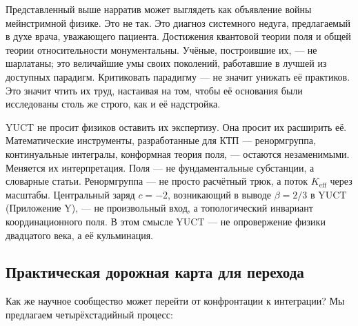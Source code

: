 \documentclass[12pt,a4paper]{article}
\begin{document}
	Представленный выше нарратив может выглядеть как объявление войны мейнстримной физике. Это не так. Это диагноз системного недуга, предлагаемый в духе врача, уважающего пациента. Достижения квантовой теории поля и общей теории относительности монументальны. Учёные, построившие их, — не шарлатаны; это величайшие умы своих поколений, работавшие в лучшей из доступных парадигм. Критиковать парадигму — не значит унижать её практиков. Это значит чтить их труд, настаивая на том, чтобы её основания были исследованы столь же строго, как и её надстройка.
	
	YUCT не просит физиков оставить их экспертизу. Она просит их расширить её. Математические инструменты, разработанные для КТП — ренормгруппа, континуальные интегралы, конформная теория поля, — остаются незаменимыми. Меняется их интерпретация. Поля — не фундаментальные субстанции, а словарные статьи. Ренормгруппа — не просто расчётный трюк, а поток \(K_{\mathrm{eff}}\) через масштабы. Центральный заряд \(c = -2\), возникающий в выводе \(\beta = 2/3\) в YUCT (Приложение Y), — не произвольный вход, а топологический инвариант координационного поля. В этом смысле YUCT — не опровержение физики двадцатого века, а её кульминация.
	
	\subsection{Практическая дорожная карта для перехода}
	
	Как же научное сообщество может перейти от конфронтации к интеграции? Мы предлагаем четырёхстадийный процесс:
	
\end{document}
